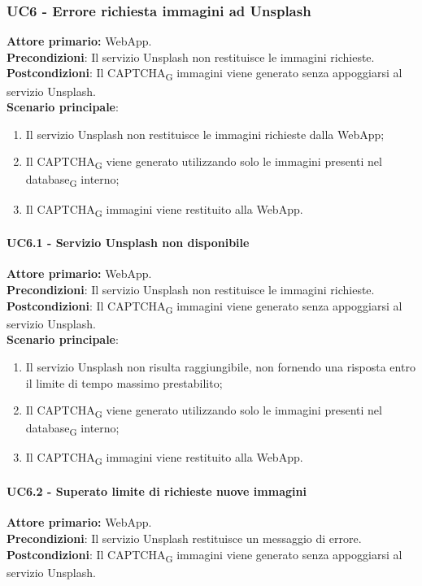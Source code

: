 \subsubsection{UC6 - Errore richiesta immagini ad Unsplash}
\textbf{Attore primario:} WebApp.\\
\textbf{Precondizioni}: Il servizio Unsplash non restituisce le immagini richieste.\\
\textbf{Postcondizioni}: Il CAPTCHA\textsubscript{G} immagini viene generato senza appoggiarsi al servizio Unsplash.\\

\textbf{Scenario principale}:
\begin{enumerate}
    \item Il servizio Unsplash non restituisce le immagini richieste dalla WebApp;
    \item Il CAPTCHA\textsubscript{G} viene generato utilizzando solo le immagini presenti nel database\textsubscript{G} interno;
    \item Il CAPTCHA\textsubscript{G} immagini viene restituito alla WebApp.
\end{enumerate}

\paragraph{UC6.1 - Servizio Unsplash non disponibile}
\textbf{Attore primario:} WebApp.\\
\textbf{Precondizioni}: Il servizio Unsplash non restituisce le immagini richieste.\\
\textbf{Postcondizioni}: Il CAPTCHA\textsubscript{G} immagini viene generato senza appoggiarsi al servizio Unsplash.\\

\textbf{Scenario principale}:
\begin{enumerate}
    \item Il servizio Unsplash non risulta raggiungibile, non fornendo una risposta entro il limite di tempo massimo prestabilito;
    \item Il CAPTCHA\textsubscript{G} viene generato utilizzando solo le immagini presenti nel database\textsubscript{G} interno;
    \item Il CAPTCHA\textsubscript{G} immagini viene restituito alla WebApp.
\end{enumerate}

\paragraph{UC6.2 - Superato limite di richieste nuove immagini}
\textbf{Attore primario:} WebApp.\\
\textbf{Precondizioni}: Il servizio Unsplash restituisce un messaggio di errore.\\
\textbf{Postcondizioni}: Il CAPTCHA\textsubscript{G} immagini viene generato senza appoggiarsi al servizio Unsplash.\\

